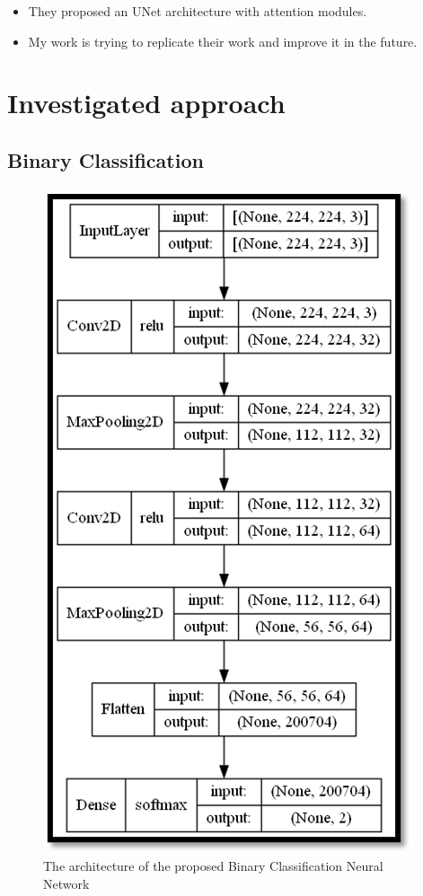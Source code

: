 \documentclass[runningheads,a4paper,11pt]{report}
\begin{document}
\begin{itemize}
	\item They proposed an UNet architecture with attention modules.
	\item My work is trying to replicate their work and improve it in the future.
\end{itemize}


\chapter{Investigated approach}
\label{chapter:proposedApproach}

\section{Binary Classification}
\label{section:binaryClassification}

\begin{figure}[htbp]
    \centerline{\includegraphics{assets/binaryClassificationArchitecture.png}}  
    \caption{The architecture of the proposed Binary Classification Neural Network}
    \label{binaryClassificationFigure}
\end{figure}
\end{document}
